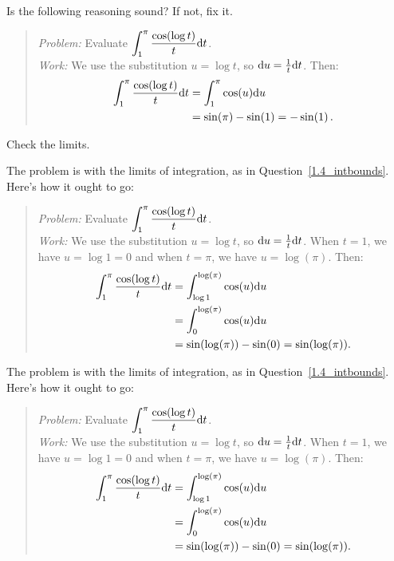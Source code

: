 \begin{question}
Is the following reasoning sound? If not, fix it.
\begin{quote}
\emph{Problem:} Evaluate $\displaystyle\int_{1}^{\pi} \dfrac{\cos(\log t)}{t}\mathrm{d}t$.\\[10pt]
\emph{Work:} We use the substitution $u=\log t$, so $\mathrm{d}u=\frac{1}{t}\mathrm{d}t$. Then:
\begin{align*}
\int_{1}^{\pi} \dfrac{\cos(\log t)}{t}\mathrm{d}t&=\int_1^{\pi}\cos(u) \mathrm{d}u\\
&=\sin(\pi)-\sin(1)=-\sin(1)\, .
\end{align*}
\end{quote}
\end{question}
\begin{hint}
Check the limits.
\end{hint}
\begin{answer}
The problem is with the limits of integration, as in Question~\ref{1.4_intbounds}. Here's how it ought to go:
\begin{quote}
\emph{Problem:} Evaluate $\displaystyle\int_{1}^{\pi} \dfrac{\cos(\log t)}{t}\mathrm{d}t$.\\[10pt]
\emph{Work:} We use the substitution $u=\log t$, so $\mathrm{d}u=\frac{1}{t}\mathrm{d}t$. When $t=1$, we have $u=\log 1 =0$ and when $t=\pi$, we have $u=\log(\pi)$.
Then:
\begin{align*}
\int_{1}^{\pi} \dfrac{\cos(\log t)}{t}\mathrm{d}t&=\int_{\log 1}^{\log(\pi)}\cos(u) \mathrm{d}u\\
&=\int_{0}^{\log(\pi)}\cos(u) \mathrm{d}u\\
&=\sin(\log(\pi))-\sin(0)=\sin(\log(\pi)) .
\end{align*}
\end{quote}
\end{answer}
\begin{solution}
The problem is with the limits of integration, as in Question~\ref{1.4_intbounds}. Here's how it ought to go:
\begin{quote}
\emph{Problem:} Evaluate $\displaystyle\int_{1}^{\pi} \dfrac{\cos(\log t)}{t}\mathrm{d}t$.\\[10pt]
\emph{Work:} We use the substitution $u=\log t$, so $\mathrm{d}u=\frac{1}{t}\mathrm{d}t$.
When $t=1$, we have $u=\log 1 =0$ and when $t=\pi$, we have $u=\log(\pi)$. Then:
\begin{align*}
\int_{1}^{\pi} \dfrac{\cos(\log t)}{t}\mathrm{d}t&=\int_{\log 1}^{\log(\pi)}\cos(u) \mathrm{d}u\\
&=\int_{0}^{\log(\pi)}\cos(u) \mathrm{d}u\\
&=\sin(\log(\pi))-\sin(0)=\sin(\log(\pi)) .
\end{align*}
\end{quote}

\end{solution}

